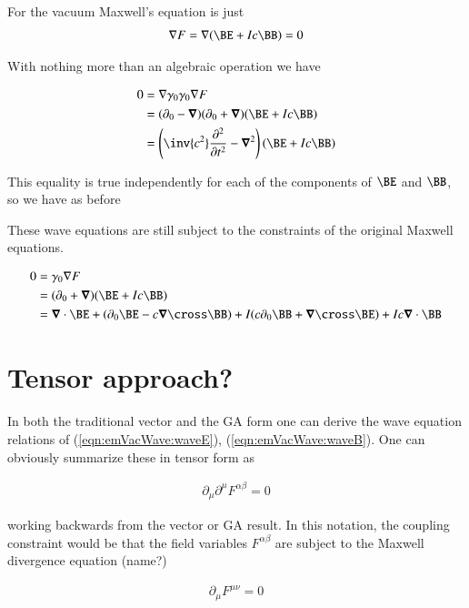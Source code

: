 For the vacuum Maxwell's equation is just
\begin{align*}
\grad F = \grad (\BE + I c \BB) = 0
\end{align*}

With nothing more than an algebraic operation we have

\begin{align*}
0 
&= \grad \gamma_0 \gamma_0 \grad F \\
&=
( \partial_0 - \spacegrad ) ( \partial_0 + \spacegrad ) (\BE + I c \BB) \\
&=
\left( \inv{c^2} \frac{\partial^2}{\partial t^2} - \spacegrad^2 \right) (\BE + I c \BB) \\
\end{align*}

This equality is true independently for each of the components of $\BE$ and $\BB$, so we have as before

These wave equations are still subject to the constraints of the original Maxwell equations.  

\begin{align*}
0 &= \gamma_0 \grad F \\
&= (\partial_0 + \spacegrad) (\BE + I c \BB) \\
&= 
  \spacegrad \cdot \BE 
+ (\partial_0 \BE - c \spacegrad \cross \BB)
+ I ( c \partial_0 \BB + \spacegrad \cross \BE )
+ I c \spacegrad \cdot \BB 
\\
\end{align*}

\section{Tensor approach?}

In both the traditional vector and the GA form one can derive the wave equation relations of (\ref{eqn:emVacWave:waveE}), (\ref{eqn:emVacWave:waveB}).  One can obviously summarize these in tensor form as

\begin{align}\label{eqn:emVacWave:waveFaraday}
\partial_\mu\partial^\mu F^{\alpha\beta} = 0
\end{align}

working backwards from the vector or GA result.  In this notation, the coupling constraint would be that the field variables $F^{\alpha\beta}$ are subject to the Maxwell divergence equation (name?)

\begin{align}\label{eqn:emVacWave:divergenceFaraday}
\partial_\mu F^{\mu\nu} = 0
\end{align}

